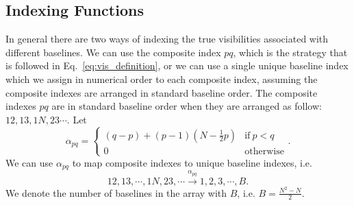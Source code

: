 \documentclass[useAMS,usenatbib]{mn2e}
\begin{document}
\subsection{Indexing Functions}
\label{sec:indexing}
In general there are two ways of indexing the true visibilities associated with different baselines. We can use the composite index $pq$, which is the strategy that is followed in Eq.~\eqref{eq:vis_definition},
or we can use a single unique baseline index which we assign in numerical order to each composite index, assuming the composite indexes are arranged in standard baseline order.
The composite indexes $pq$ are in standard baseline order when they are arranged as follow: $12, 13, 1N, 23\cdots$. Let 
\begin{equation}
\alpha_{pq} =
\begin{cases}
(q-p) + (p-1)\left (N-\frac{1}{2}p \right ) & \textrm{if}~p<q\\
0 & \textrm{otherwise}
\end{cases}.
\end{equation}
We can use $\alpha_{pq}$ to map composite indexes to unique baseline indexes, i.e. 
\begin{equation}
12,13,\cdots,1N,23,\cdots \xrightarrow{\alpha_{pq}} 1,2,3,\cdots,B.
\end{equation}
We denote the number of baselines in the array with $B$, i.e. $B = \frac{N^2-N}{2}$.
\end{document}
